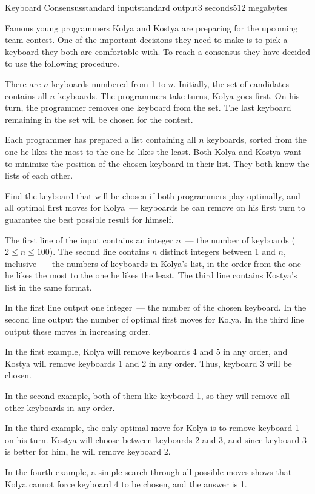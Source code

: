 \begin{problem}{Keyboard Consensus}{standard input}{standard output}{3 seconds}{512 megabytes}

Famous young programmers Kolya and Kostya are preparing for the upcoming team contest. One of the important decisions they need to make is to pick a keyboard they both are comfortable with. To reach a consensus they have decided to use the following procedure.

There are $n$ keyboards numbered from 1 to $n$. Initially, the set of candidates contains all $n$ keyboards. The programmers take turns, Kolya goes first. On his turn, the programmer removes one keyboard from the set. The last keyboard remaining in the set will be chosen for the contest.

Each programmer has prepared a list containing all $n$ keyboards, sorted from the one he likes the most to the one he likes the least. Both Kolya and Kostya want to minimize the position of the chosen keyboard in their list. They both know the lists of each other.

Find the keyboard that will be chosen if both programmers play optimally, and all optimal first moves for Kolya~--- keyboards he can remove on his first turn to guarantee the best possible result for himself.

\InputFile
The first line of the input contains an integer $n$~--- the number of keyboards ($2 \le n \le 100$). The second line contains $n$ distinct integers between 1 and $n$, inclusive~--- the numbers of keyboards in Kolya's list, in the order from the one he likes the most to the one he likes the least. The third line contains Kostya's list in the same format.

\OutputFile
In the first line output one integer~--- the number of the chosen keyboard. In the second line output the number of optimal first moves for Kolya. In the third line output these moves in increasing order.

\Examples

\begin{example}
%
%
%
%
\end{example}

\Note
In the first example, Kolya will remove keyboards 4 and 5 in any order, and Kostya will remove keyboards 1 and 2 in any order. Thus, keyboard 3 will be chosen.

In the second example, both of them like keyboard 1, so they will remove all other keyboards in any order.

In the third example, the only optimal move for Kolya is to remove keyboard 1 on his turn. Kostya will choose between keyboards 2 and 3, and since keyboard 3 is better for him, he will remove keyboard 2.

In the fourth example, a simple search through all possible moves shows that Kolya cannot force keyboard 4 to be chosen, and the answer is 1.

\end{problem}

